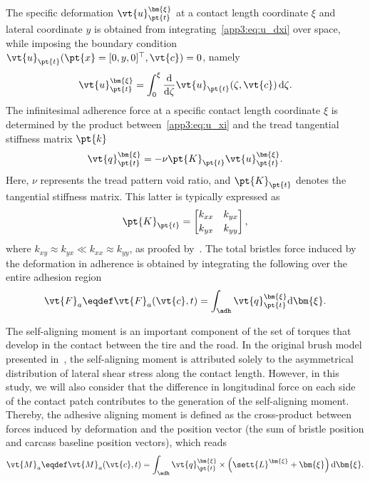 %
The specific deformation $\vt{u}_{\pt{t}}^{\bm{\xi}}$ at a contact length coordinate $\xi$ and lateral coordinate $y$ is obtained from integrating~\eqref{app3:eq:u_dxi} over space, while imposing the boundary condition $\vt{u}_{\pt{t}}(\pt{x} = [0,y,0]^\top,\vt{c}) = 0$, namely
%
\begin{equation}
  \vt{u}_{\pt{t}}^{\bm{\xi}} = \int_0^\xi \dfrac{\mathrm{d}}{\mathrm{d}\zeta}\vt{u}_{\pt{t}}(\zeta,\vt{c}) \,\mathrm{d}\zeta.
  \label{app3:eq:u_xi}
\end{equation}
%
The infinitesimal adherence force at a specific contact length coordinate $\xi$ is determined by the product between~\eqref{app3:eq:u_xi} and the tread tangential stiffness matrix $\pt{k}$
%
\begin{equation}
  \vt{q}_{\pt{t}}^{\bm{\xi}} = -\nu\pt{K}_{\pt{t}}\vt{u}_{\pt{t}}^{\bm{\xi}}.
  \label{app3:eq:fa}
\end{equation}
%
Here, $\nu$ represents the tread pattern void ratio, and $\pt{K}_{\pt{t}}$ denotes the tangential stiffness matrix. This latter is typically expressed as
%
\begin{equation}
  \pt{K}_{\pt{t}} =
  \begin{bmatrix}
    k_{xx} & k_{yx} \\[0.2em]
    k_{yx} & k_{yy}
  \end{bmatrix},
\end{equation}
%
where $k_{xy} \approx k_{yx} \ll k_{xx} \approx k_{yy}$, as proofed by~\citet{okonieski2003simpified}. The total bristles force induced by the deformation in adherence is obtained by integrating the following over the entire adhesion region \adh{}
%
\begin{equation}
  \vt{F}_a \eqdef \vt{F}_a(\vt{c},t) = \int_{\adh} \vt{q}_{\pt{t}}^{\bm{\xi}} \mathrm{d}\bm{\xi}.
  \label{app3:eq:F_a}
\end{equation}

The self-aligning moment is an important component of the set of torques that develop in the contact between the tire and the road. In the original brush model presented in~\cite{pacejka2012tire}, the self-aligning moment is attributed solely to the asymmetrical distribution of lateral shear stress along the contact length. However, in this study, we will also consider that the difference in longitudinal force on each side of the contact patch contributes to the generation of the self-aligning moment. Thereby, the adhesive aligning moment is defined as the cross-product between forces induced by deformation and the position vector (the sum of bristle position and carcass baseline position vectors), which reads
%
\begin{equation}
  \vt{M}_{a} \eqdef \vt{M}_{a}(\vt{c},t) = \int_{\adh} \vt{q}_{\pt{t}}^{\bm{\xi}} \times \left(\sett{L}^{\bm{\xi}} + \bm{\xi}\right) \mathrm{d}\bm{\xi}.
  \label{app3:eq:M_a}
\end{equation}

